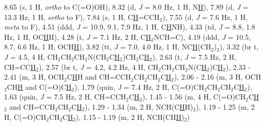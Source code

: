 {{{{{{{{{{{{{{{{{{{	8.65 (s, 1 H, \textit{ortho} to C(=O)OH), 
	8.32 (d, \textit{J} = 8.0 Hz, 1 H, N\underline{H}), 
	7.89 (d, \textit{J} = 13.3 Hz, 1 H, \textit{ortho} to F), 
	7.84 (s, 1 H, C\underline{H}=CCH$_2$), 
	7.55 (d, \textit{J} = 7.6 Hz, 1 H, \textit{meta} to F), 
	4.51 (ddd, \textit{J} = 10.9, 9.1, 7.9 Hz, 1 H, C\underline{H}NH), 
	4.33 (td, \textit{J} = 8.8, 1.8 Hz, 1 H, OC\underline{H}H), 
	4.28 (t, \textit{J} = 7.1 Hz, 2 H, C\underline{H}$_2$NCH=C), 
	4.19 (ddd, \textit{J} = 10.5, 8.7, 6.6 Hz, 1 H, OCH\underline{H}), 
	3.82 (tt, \textit{J} = 7.0, 4.0 Hz, 1 H, NC\underline{H}(CH$_2$)$_2$), 
	3.32 (br t, \textit{J} = 4.5, 4 H, CH$_2$CH$_2$CH$_2$N(CH$_2$C\underline{H}$_2$)CH$_2$C\underline{H}$_2$), 
	2.63 (t, \textit{J} = 7.5 Hz, 2 H, CH=CC\underline{H}$_2$), 
	2.57 (br t, \textit{J} = 4.2, 4.2 Hz, 4 H, CH$_2$CH$_2$CH$_2$N(C\underline{H}$_2$)C\underline{H}$_2$), 
	2.33 - 2.41 (m, 3 H, OCH$_2$C\underline{H}H and CH=CCH$_2$CH$_2$CH$_2$C\underline{H}$_2$), 
	2.06 - 2.16 (m, 3 H, OCH$_2$CH\underline{H} and C(=O)C\underline{H}$_2$), 
	1.79 (quin, \textit{J} = 7.4 Hz, 2 H, C(=O)CH$_2$CH$_2$CH$_2$C\underline{H}$_2$), 
	1.63 (quin, \textit{J} = 7.5 Hz, 2 H, CH=CCH$_2$C\underline{H}$_2$), 
	1.45 - 1.56 (m, 4 H, C(=O)CH$_2$C\underline{H}$_2$ and CH=CCH$_2$CH$_2$C\underline{H}$_2$), 
	1.29 - 1.34 (m, 2 H, NCH(C\underline{H}H)$_2$), 
	1.19 - 1.25 (m, 2 H, C(=O)CH$_2$CH$_2$C\underline{H}$_2$), 
	1.15 - 1.19 (m, 2 H, NCH(CH\underline{H})$_2$)
\\[1\baselineskip]
}}}}}}}}}}}}}}}}}}}
